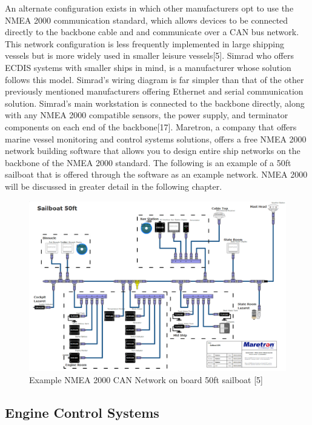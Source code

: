 \documentclass{report}
\begin{document}
An alternate configuration exists in which other manufacturers opt to use the NMEA 2000 communication standard, which allows devices to be connected directly to the backbone cable and and communicate over a CAN bus network. This network configuration is less frequently implemented in large shipping vessels but is more widely used in smaller leisure vessels[5]. Simrad who offers ECDIS systems with smaller ships in mind, is a manufacturer whose solution follows this model. Simrad's wiring diagram is far simpler than that of the other previously mentioned manufacturers offering Ethernet and serial communication solution. Simrad's main workstation is connected to the backbone directly, along with any NMEA 2000 compatible sensors, the power supply, and terminator components on each end of the backbone[17]. Maretron, a company that offers marine vessel monitoring and control systems solutions, offers a free NMEA 2000 network building software that allows you to design entire ship networks on the backbone of the NMEA 2000 standard. The following is an example of a 50ft sailboat that is offered through the software as an example network. NMEA 2000 will be discussed in greater detail in the following chapter.
\begin{figure}[h]
    \centering
    \includegraphics[width=12cm]{Images and Figures/NMEA2K.png}
    \caption{Example NMEA 2000 CAN Network on board 50ft sailboat [5]}
    \label{fig:NMEA CAN}
\end{figure}
 
\subsection{Engine Control Systems }
\end{document}
